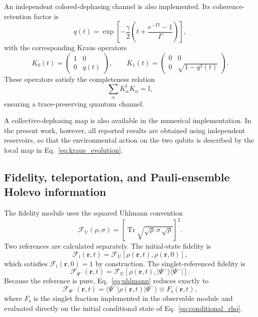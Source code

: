 \documentclass[aps,prb,twocolumn,superscriptaddress,longbibliography]{revtex4-2}
\begin{document}
An independent colored-dephasing channel is also implemented. Its
coherence-retention factor is
%
\begin{equation}\boxed{
q(t)
=
\exp
\left[
-\frac{\gamma}{2}
\left(
t+
\frac{e^{-\Gamma t}-1}{\Gamma}
\right)
\right],
}\label{eq:dephasing_factor}\end{equation}
%
with the corresponding Kraus operators
%
\begin{equation}\boxed{
K_{0}(t)
=
\begin{pmatrix}
1 & 0 \\
0 & q(t)
\end{pmatrix},
\qquad
K_{1}(t)
=
\begin{pmatrix}
0 & 0 \\
0 & \sqrt{1-q^2(t)}
\end{pmatrix}.
}\label{eq:dephasing_kraus}\end{equation}
%
These operators satisfy the completeness relation
%
\begin{equation}\boxed{
\sum_{\alpha}
K_{\alpha}^{\dagger}K_{\alpha}
=
\mathbb{I},
}\end{equation}
%
ensuring a trace-preserving quantum channel.

A collective-dephasing map is also available in the numerical
implementation. In the present work, however, all reported results
are obtained using independent reservoirs, so that the environmental
action on the two qubits is described by the local map in
Eq.~\eqref{eq:kraus_evolution}.

\subsection{Fidelity, teleportation, and Pauli-ensemble Holevo information}
\label{sec:information_measures}

The fidelity module uses the squared Uhlmann convention
\begin{equation}\boxed{
\mathcal F_{\mathrm U}(\rho,\sigma)
=
\left[
\operatorname{Tr}
\sqrt{\sqrt{\rho}\,\sigma\,\sqrt{\rho}}
\right]^2.
}\label{eq:uhlmann}\end{equation}
Two references are calculated separately. The initial-state fidelity is
\begin{equation}\boxed{
\mathcal F_{\mathrm i}(\mathbf r,t)
=
\mathcal F_{\mathrm U}\!\left[\rho(\mathbf r,t),\rho(\mathbf r,0)\right],
}\end{equation}
which satisfies $\mathcal F_{\mathrm i}(\mathbf r,0)=1$ by construction.
The singlet-referenced fidelity is
\begin{equation}\boxed{
\mathcal F_{\Psi^-}(\mathbf r,t)
=
\mathcal F_{\mathrm U}\!\left[\rho(\mathbf r,t),
|\Psi^-\rangle\langle\Psi^-|\right].
}\end{equation}
Because the reference is pure, Eq.~\eqref{eq:uhlmann} reduces exactly to
\begin{equation}\boxed{
\mathcal F_{\Psi^-}(\mathbf r,t)
=
\langle\Psi^-|\rho(\mathbf r,t)|\Psi^-\rangle
\equiv F_{\mathrm s}(\mathbf r,t),
}\label{eq:singlet_fidelity}\end{equation}
where $F_{\mathrm s}$ is the singlet fraction implemented in the observable
module and evaluated directly on the initial conditional state of
Eq.~\eqref{eq:conditional_rho}.
\end{document}
